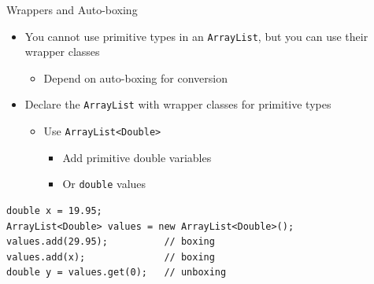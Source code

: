 \documentclass[aspectratio=43,10pt,t]{beamer}
\newcommand{\code}[1]{\texttt{#1}}
\begin{document}
\begin{frame}[fragile]{Wrappers and Auto-boxing}
  \begin{itemize}
    \item You cannot use primitive types in an \code{ArrayList}, but you can use their wrapper classes
      \begin{itemize}
        \item Depend on auto-boxing for conversion
      \end{itemize}
    \item Declare the \code{ArrayList} with wrapper classes for primitive types
      \begin{itemize}
        \item Use \code{ArrayList<Double>}
          \begin{itemize}
            \item Add primitive double variables
            \item Or \code{double} values
          \end{itemize}
      \end{itemize}
  \end{itemize}
\begin{lstlisting}[linewidth=0.82\linewidth,xleftmargin=0.12\linewidth]
double x = 19.95;
ArrayList<Double> values = new ArrayList<Double>();
values.add(29.95);          // boxing
values.add(x);              // boxing
double y = values.get(0);   // unboxing
\end{lstlisting}
\end{frame}
\end{document}
